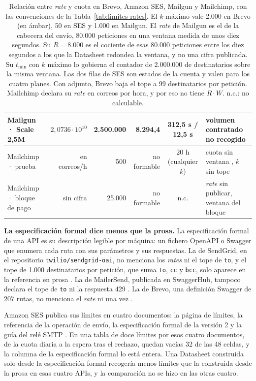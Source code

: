 \begin{table}[H]
\begin{tabular}{|l|r|r|r|c|p{2.7cm}|}
\hline
Mailgun · Scale 2,5M & $2{,}0736 \cdot 10^{10}$ & 2.500.000 & 8.294,4 & 312,5 s / 12,5 s & volumen contratado no recogido \\
\hline
Mailchimp · prueba & en correos/h & 500 & no formable & 20 h (cualquier $k$) & cuota sin ventana \semrojo{}, $k$ sin tope \semrojo{} \\
\hline
Mailchimp · bloque de pago & sin cifra & 25.000 & no formable & n.c. & \textit{rate} sin publicar, ventana del bloque \semambar{} \\
\hline
\end{tabular}
\caption[Relación entre \textit{rate} y cuota en Brevo, Amazon SES, Mailgun y Mailchimp]{Relación entre \textit{rate} y cuota en Brevo, Amazon SES, Mailgun y Mailchimp, con las convenciones de la Tabla~\ref{tab:limites-rates}. El $k$ máximo vale 2.000 en Brevo (en ámbar), 50 en SES y 1.000 en Mailgun. El \textit{rate} de Mailgun es el de la cabecera del envío, 80.000 peticiones en una ventana medida de unos diez segundos. Su $R = 8.000$ es el cociente de esas 80.000 peticiones entre los diez segundos a los que la Datasheet redondea la ventana, y no una cifra publicada. Su $t_{\min}$ con $k$ máximo lo gobierna el contador de 2.000.000 de destinatarios sobre la misma ventana. Las dos filas de SES son estados de la cuenta y valen para los cuatro planes. Con adjunto, Brevo baja el tope a 99 destinatarios por petición. Mailchimp declara su \textit{rate} en correos por hora, y por eso no tiene $R \cdot W$. n.c.: no calculable.}
\label{tab:limites-rates-b}
\end{table}

\textbf{La especificación formal dice menos que la prosa.}
La especificación formal de una API es su descripción legible por máquina: un fichero OpenAPI o Swagger que enumera cada ruta con sus parámetros y sus respuestas.
La de SendGrid, en el repositorio \texttt{twilio/sendgrid-oai}, no menciona los \textit{rates} ni el tope de \texttt{to}, y el tope de 1.000 destinatarios por petición, que suma \texttt{to}, \texttt{cc} y \texttt{bcc}, solo aparece en la referencia en prosa \citep{sendgriddocs}.
La de MailerSend, publicada en SwaggerHub, tampoco declara el tope de \texttt{to} ni la respuesta 429 \citep{mailersenddocs}.
La de Brevo, una definición Swagger de 207 rutas, no menciona el \textit{rate} ni una vez \citep{brevodocs}.

Amazon SES publica sus límites en cuatro documentos: la página de límites, la referencia de la operación de envío, la especificación formal de la versión 2 y la guía del relé SMTP \citep{sesdocs}.
En una tabla de doce límites por esos cuatro documentos, de la cuota diaria a la espera tras el rechazo, quedan vacías 32 de las 48 celdas, y la columna de la especificación formal lo está entera.
Una Datasheet construida solo desde la especificación formal recogería menos límites que la construida desde la prosa en esas cuatro APIs, y la comparación no se hizo en las otras cuatro.
